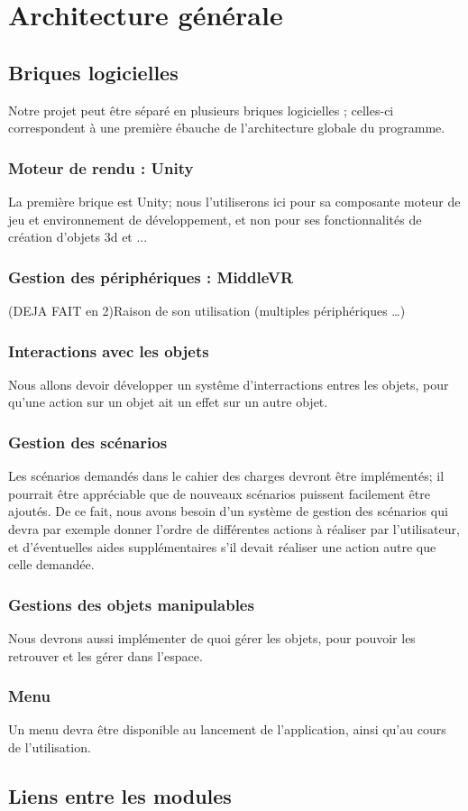 \section{Architecture générale}
	\subsection{Briques logicielles}
		Notre projet peut être séparé en plusieurs briques logicielles ; celles-ci correspondent à une première ébauche de l'architecture globale du programme.
		\subsubsection{Moteur de rendu : Unity}
			La première brique est Unity; nous l'utiliserons ici pour sa composante moteur de jeu et environnement de développement, et non pour ses fonctionnalités de création d'objets 3d et ... 
		\subsubsection{Gestion des périphériques : MiddleVR}
			(DEJA FAIT en 2)Raison de son utilisation (multiples périphériques …)
		\subsubsection{Interactions avec les objets}
			Nous allons devoir développer un systême d'interractions entres les objets, pour qu'une action sur un objet ait un effet sur un autre objet.
		\subsubsection{Gestion des scénarios}
			Les scénarios demandés dans le cahier des charges devront être implémentés; il pourrait être appréciable que de nouveaux scénarios puissent facilement être ajoutés.
			De ce fait, nous avons besoin d'un système de gestion des scénarios qui devra par exemple donner l'ordre de différentes actions à réaliser par l'utilisateur, et d'éventuelles aides supplémentaires s'il devait réaliser une action autre que celle demandée.
		\subsubsection{Gestions des objets manipulables}
			Nous devrons aussi implémenter de quoi gérer les objets, pour pouvoir les retrouver et les gérer dans l'espace.
		\subsubsection{Menu}
			Un menu devra être disponible au lancement de l'application, ainsi qu'au cours de l'utilisation.
	\subsection{Liens entre les modules}

